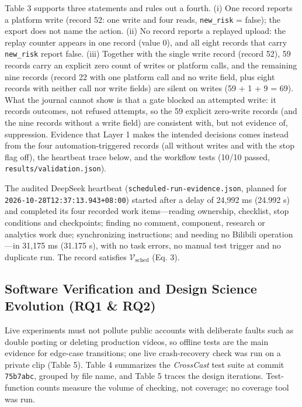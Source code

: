 \documentclass[11pt,a4paper]{article}
\theoremstyle{definition}
\begin{document}
Table 3 supports three statements and rules out a fourth. (i) One record reports a platform write (record 52: one write and four reads, \texttt{new\_risk} = false); the export does not name the action. (ii) No record reports a replayed upload: the replay counter appears in one record (value 0), and all eight records that carry \texttt{new\_risk} report false. (iii) Together with the single write record (record 52), 59 records carry an explicit zero count of writes or platform calls, and the remaining nine records (record 22 with one platform call and no write field, plus eight records with neither call nor write fields) are silent on writes (59 + 1 + 9 = 69). What the journal cannot show is that a gate blocked an attempted write: it records outcomes, not refused attempts, so the 59 explicit zero-write records (and the nine records without a write field) are consistent with, but not evidence of, suppression. Evidence that Layer 1 makes the intended decisions comes instead from the four automation-triggered records (all without writes and with the stop flag off), the heartbeat trace below, and the workflow tests (10/10 passed, \texttt{results/\allowbreak{}validation.\allowbreak{}json}).

The audited DeepSeek heartbeat (\texttt{scheduled-\allowbreak{}run-\allowbreak{}evidence.\allowbreak{}json}, planned for \texttt{2026\allowbreak{}-\allowbreak{}10-\allowbreak{}28T12:37:13.\allowbreak{}943+08:00}) started after a delay of 24,992 ms (24.992 s) and completed its four recorded work items---reading ownership, checklist, stop conditions and checkpoints; finding no comment, component, research or analytics work due; synchronizing instructions; and needing no Bilibili operation---in 31,175 ms (31.175 s), with no task errors, no manual test trigger and no duplicate run. The record satisfies $\mathcal{V}_{\text{sched}}$ (Eq. 3).

\subsection{Software Verification and Design Science Evolution (RQ1 \& RQ2)}
\label{sec:6.2}

Live experiments must not pollute public accounts with deliberate faults such as double posting or deleting production videos, so offline tests are the main evidence for edge-case transitions; one live crash-recovery check was run on a private clip (Table 5). Table 4 summarizes the \emph{CrossCast} test suite at commit \texttt{75b7abc}, grouped by file name, and Table 5 traces the design iterations. Test-function counts measure the volume of checking, not coverage; no coverage tool was run.
\end{document}
